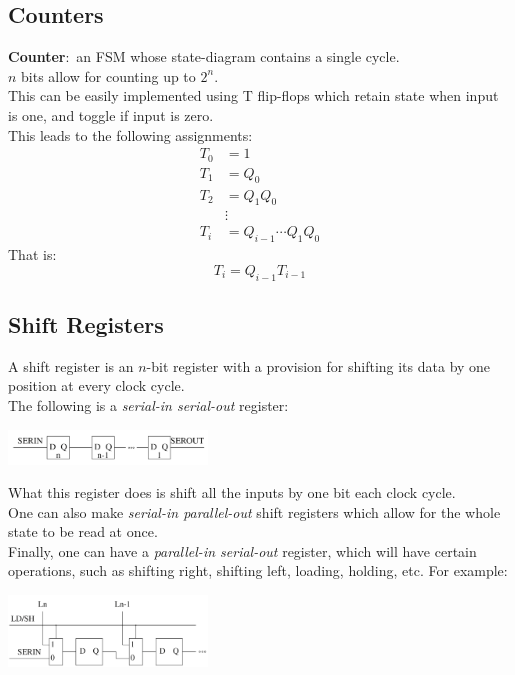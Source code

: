 \documentclass[nobib]{tufte-handout}
\newcommand{\defn}[2]{\noindent\textbf{#1}:\ #2}
\begin{document}
    \subsection{Counters}
    \defn{Counter}{an FSM whose state-diagram contains a single cycle.}\\
$n$ bits allow for counting up to $2^n$.\\
    This can be easily implemented using T flip-flops which retain state when input is one, and toggle if input is zero.\\
    This leads to the following assignments:
    \begin{align*}
        T_0 & =1                    \\
        T_1 & =Q_0                  \\
        T_2 & =Q_1Q_0               \\
            & \vdots                \\
        T_i & =Q_{i-1}\cdots Q_1Q_0
    \end{align*}
    That is:
    \begin{equation*}
        T_i = Q_{i-1}T_{i-1}
    \end{equation*}
    \subsection{Shift Registers}
    A shift register is an $n$-bit register with a provision for shifting its data
    by one position at every clock cycle.\\ The following is a \textit{serial-in
        serial-out} register:
    \begin{center}
        \includegraphics[width = 200px]{images/serialinoutreg.png}
    \end{center}
    What this register does is shift all the inputs by one bit each clock cycle.\\
    One can also make \textit{serial-in parallel-out} shift registers which allow for the whole state to be read at once.\\
    Finally, one can have a \textit{parallel-in serial-out} register, which will have certain operations, such as shifting right, shifting left, loading, holding, etc.
    For example:
    \begin{center}
        \includegraphics[width = 200px]{images/parinseroutreg.png}
    \end{center}
\end{document}
